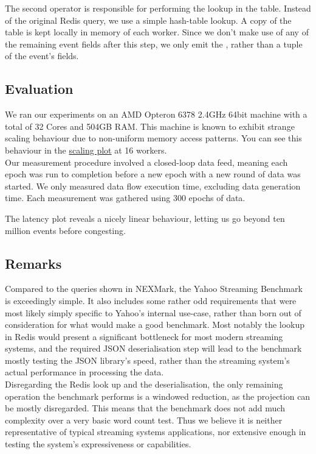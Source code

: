 The second  operator is responsible for performing the lookup in the  table. Instead of the original Redis query, we use a simple hash-table lookup. A copy of the table is kept locally in memory of each worker. Since we don't make use of any of the remaining event fields after this step, we only emit the , rather than a tuple of the event's fields.

\subsection{Evaluation}
We ran our experiments on an AMD Opteron 6378 2.4GHz 64bit machine with a total of 32 Cores and 504GB RAM. This machine is known to exhibit strange scaling behaviour due to non-uniform memory access patterns. You can see this behaviour in the \hyperref[figure:ysb-scaling]{scaling plot} at 16 workers. \\

Our measurement procedure involved a closed-loop data feed, meaning each epoch was run to completion before a new epoch with a new round of data was started. We only measured data flow execution time, excluding data generation time. Each measurement was gathered using 300 epochs of data. \\


The latency plot reveals a nicely linear behaviour, letting us go beyond ten million events before congesting.

\subsection{Remarks}\label{section:ysb-remarks}
Compared to the queries shown in NEXMark, the Yahoo Streaming Benchmark is exceedingly simple. It also includes some rather odd requirements that were most likely simply specific to Yahoo's internal use-case, rather than born out of consideration for what would make a good benchmark. Most notably the lookup in Redis would present a significant bottleneck for most modern streaming systems, and the required JSON deserialisation step will lead to the benchmark mostly testing the JSON library's speed, rather than the streaming system's actual performance in processing the data. \\

Disregarding the Redis look up and the deserialisation, the only remaining operation the benchmark performs is a windowed reduction, as the projection can be mostly disregarded. This means that the benchmark does not add much complexity over a very basic word count test. Thus we believe it is neither representative of typical streaming systems applications, nor extensive enough in testing the system's expressiveness or capabilities.

